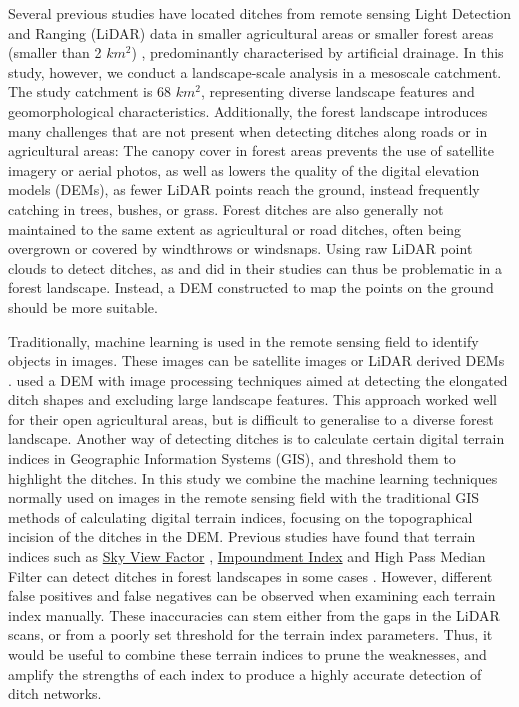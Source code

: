 \documentclass[11pt, review]{elsarticle} %
\begin{document}
Several previous studies have located ditches from remote sensing Light Detection and Ranging (LiDAR) data in smaller agricultural areas \citep{roelens, bailly} or smaller forest areas (smaller than 2 $km^2$) \citep{rapinel, kiss}, predominantly characterised by artificial drainage. In this study, however, we conduct a landscape-scale analysis in a mesoscale catchment. The study  catchment  is 68 $km^2$, representing diverse landscape features and geomorphological characteristics. Additionally, the forest landscape introduces many challenges that are not present when detecting ditches along roads or in agricultural areas: The canopy cover in forest areas prevents the use of satellite imagery or aerial photos, as well as lowers the quality of the digital elevation models (DEMs), as fewer LiDAR points reach the ground, instead frequently catching in trees, bushes, or grass. Forest ditches are also generally not maintained to the same extent as agricultural or road ditches, often being overgrown or covered by windthrows or windsnaps. Using raw LiDAR point clouds to detect ditches, as \citet{roelens} and \citet{bailly} did in their studies can thus be problematic in a forest landscape. Instead, a DEM constructed to map the points on the ground should be more suitable.

Traditionally, machine learning is used in the remote sensing field to identify objects in images. These images can be satellite images \citep{biomass_soil_moisture} or LiDAR derived DEMs \citep{integrated_airborne_lidar}. \citet{cazorzi} used a DEM with image processing techniques aimed at detecting the elongated ditch shapes and excluding large landscape features. This approach worked well for their open agricultural areas, but is difficult to generalise to a diverse forest landscape. Another way of detecting ditches is to calculate certain digital terrain indices in Geographic Information Systems (GIS), and threshold them to highlight the ditches. In this study we combine the machine learning techniques normally used on images in the remote sensing field with the traditional GIS methods of calculating digital terrain indices, focusing on the topographical incision of the ditches in the DEM. Previous studies have found that terrain indices such as \hyperref[skyviewfactor]{Sky View Factor} \citep{zaksek}, \hyperref[impoundment]{Impoundment Index} \citep{whiteboxtools} and High Pass Median Filter \citep{whiteboxtools} can detect ditches in forest landscapes in some cases \citep{uppsala}. However, different false positives and false negatives can be observed when examining each terrain index manually. These inaccuracies can stem either from the gaps in the LiDAR scans, or from a poorly set threshold for the terrain index parameters. Thus, it would be useful to combine these terrain indices to prune the weaknesses, and amplify the strengths of each index to produce a highly accurate detection of ditch networks. 
\end{document}

